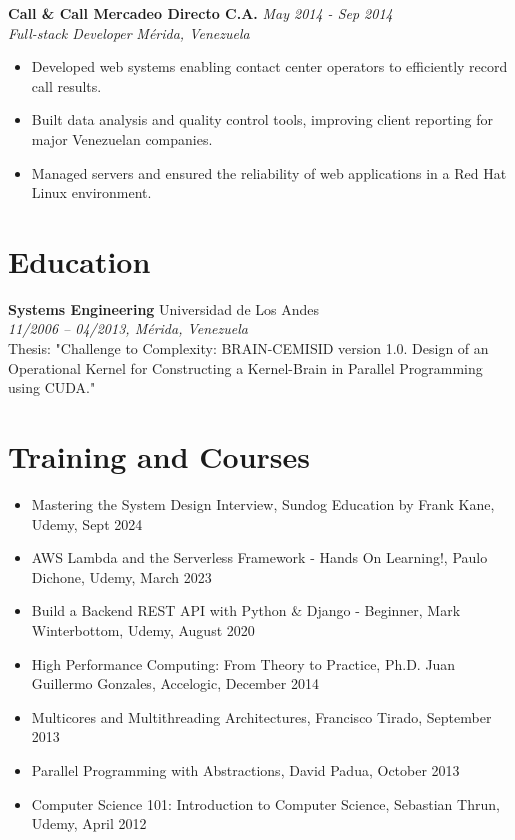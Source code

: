 \documentclass[a4paper,10pt]{article}
\begin{document}
\textbf{Call \& Call Mercadeo Directo C.A.} \hfill \textit{May 2014 - Sep 2014} \\
\textit{Full-stack Developer} \hfill \textit{Mérida, Venezuela} \\
\begin{itemize}[leftmargin=0.5cm, topsep=0pt, parsep=0pt, itemsep=2pt]
	\item Developed web systems enabling contact center operators to efficiently
	      record call results.
	\item Built data analysis and quality control tools, improving client
	      reporting for major Venezuelan companies.
	\item Managed servers and ensured the reliability of web applications in a
	      Red Hat Linux environment.
\end{itemize}

\section*{Education}
\sectionline
\textbf{Systems Engineering} \hfill Universidad de Los Andes \\
\textit{11/2006 -- 04/2013, Mérida, Venezuela} \\
Thesis: "Challenge to Complexity: BRAIN-CEMISID version 1.0. Design of an
Operational Kernel for Constructing a Kernel-Brain in Parallel Programming using
CUDA."

\section*{Training and Courses}
\sectionline
\begin{itemize}[leftmargin=0.5cm, topsep=0pt, parsep=0pt, itemsep=2pt]
	\item Mastering the System Design Interview, Sundog Education by Frank Kane,
	      Udemy, Sept 2024
	\item AWS Lambda and the Serverless Framework - Hands On Learning!, Paulo
	      Dichone, Udemy, March 2023
	\item Build a Backend REST API with Python \& Django - Beginner, Mark
	      Winterbottom, Udemy, August 2020
	\item High Performance Computing: From Theory to Practice, Ph.D. Juan
	      Guillermo Gonzales, Accelogic, December 2014
	\item Multicores and Multithreading Architectures, Francisco Tirado,
	      September 2013
	\item Parallel Programming with Abstractions, David Padua, October 2013
	\item Computer Science 101: Introduction to Computer Science, Sebastian
	      Thrun, Udemy, April 2012
\end{itemize}
\end{document}

